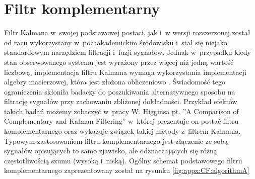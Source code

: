 \section*{Filtr komplementarny}\label{sec:appx:filters:CF}
Filtr Kalmana w~swojej podstawowej postaci, jak i~w wersji rozszerzonej został od razu wykorzystany w~pozaakademickim środowisku i~stał się niejako standardowym narzędziem filtracji i~fuzji sygnałów. Jednak w~przypadku kiedy stan obserwowanego systemu jest wyrażony przez więcej niż jedną wartość liczbową, implementacja filtru Kalmana wymaga wykorzystania implementacji algebry macierzowej, która jest złożona obliczeniowo \cite{wiki:MatrixAlgebraComplexity2016}. Świadomość tego ograniczenia skłoniła badaczy do poszukiwania alternatywnego sposobu na filtrację sygnałów przy zachowaniu zbliżonej dokładności. Przykład efektów takich badań możemy zobaczyć w~pracy W. Higginsa pt. ''A Comparison of Complementary and Kalman Filtering'' \cite{Higgins1975} w~której prezentuje on postać filtru komplementarnego oraz wykazuje związek takiej metody z~filtrem Kalmana. Typowym zastosowaniem filtru komplementarnego jest złączenie ze sobą sygnałów opisujących to samo zjawisko, ale odznaczających się różną częstotliwością szumu (wysoką i~niską). Ogólny schemat podstawowego filtru komplementarnego zaprezentowany został na rysunku \ref{fig:appx:CF:algorithmA}

\newcommand{\suma}{\Large$+$}
\newcommand{\inte}{$\displaystyle \int$}
\newcommand{\derv}{\huge$\frac{d}{dt}$}


